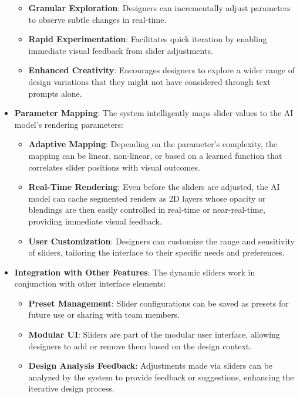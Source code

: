 \documentclass[12pt]{article}
\begin{document}
\begin{itemize}
    \begin{itemize}
        \item \textbf{Granular Exploration}: Designers can incrementally adjust parameters to observe subtle changes in real-time.
        \item \textbf{Rapid Experimentation}: Facilitates quick iteration by enabling immediate visual feedback from slider adjustments.
        \item \textbf{Enhanced Creativity}: Encourages designers to explore a wider range of design variations that they might not have considered through text prompts alone.
    \end{itemize}

    \item \textbf{Parameter Mapping}: The system intelligently maps slider values to the AI model's rendering parameters:

    \begin{itemize}
        \item \textbf{Adaptive Mapping}: Depending on the parameter's complexity, the mapping can be linear, non-linear, or based on a learned function that correlates slider positions with visual outcomes.
        \item \textbf{Real-Time Rendering}: Even before the sliders are adjusted, the AI model can cache segmented renders as 2D layers whose opacity or blendings are then easily controlled in real-time or near-real-time, providing immediate visual feedback.
        \item \textbf{User Customization}: Designers can customize the range and sensitivity of sliders, tailoring the interface to their specific needs and preferences.
    \end{itemize}

    \item \textbf{Integration with Other Features}: The dynamic sliders work in conjunction with other interface elements:

    \begin{itemize}
        \item \textbf{Preset Management}: Slider configurations can be saved as presets for future use or sharing with team members.
        \item \textbf{Modular UI}: Sliders are part of the modular user interface, allowing designers to add or remove them based on the design context.
        \item \textbf{Design Analysis Feedback}: Adjustments made via sliders can be analyzed by the system to provide feedback or suggestions, enhancing the iterative design process.
    \end{itemize}
\end{itemize}
\end{document}
